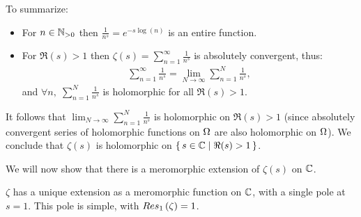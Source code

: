 To summarize:
\begin{itemize}
    \item For $n \in \mathbb{N}_{>0}$ then $\frac{1}{n^s} = e^{- s \log (n)}$ is an entire function.
    \item For $\Re(s) > 1$ then $\zeta(s) = \sum_{n=1}^\infty \frac{1}{n^s}$ is absolutely convergent, thus:
    \begin{align*}
        \sum_{n=1}^\infty \frac{1}{n^s} = \lim_{N \to \infty} \sum_{n=1}^N \frac{1}{n^s},
    \end{align*}
    and $\forall n, \; \sum_{n=1}^N \frac{1}{n^s}$ is holomorphic for all $\Re(s) >1$.
\end{itemize}

It follows that $\lim_{N \to \infty} \sum_{n=1}^N \frac{1}{n^s}$ is holomorphic on $\Re(s) > 1$ (since absolutely convergent series of holomorphic functions on $\Omega$ are also holomorphic on $\Omega$). We conclude that $\zeta(s)$ is holomorphic on $\set{s \in \mathbb{C}\mid \Re(s) >1 }$.

We will now show that there is a meromorphic extension of $\zeta(s)$ on $\mathbb{C}$.

\begin{theorem}[Riemann]\label{thm:r-zeta-extension-thm}
$\zeta$ has a unique extension as a meromorphic function on $\mathbb{C}$, with a single pole at $s=1$. This pole is simple, with $Res_{1} \left( \zeta \right) = 1$.
\end{theorem}

